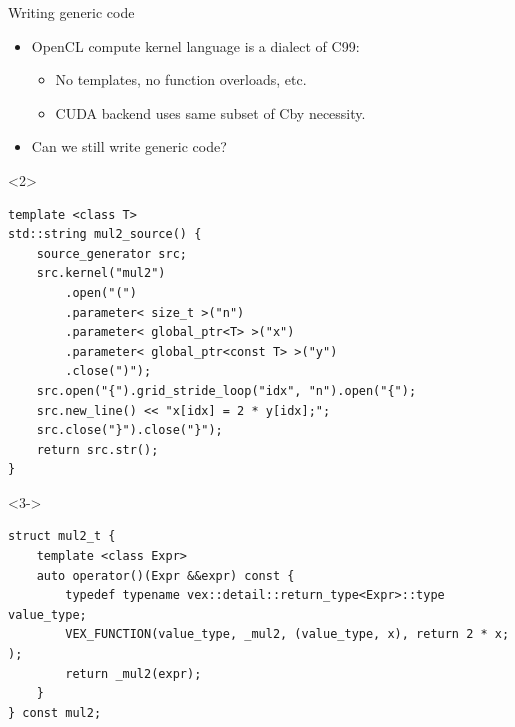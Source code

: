 \documentclass[@BEAMER_OPTIONS@]{beamer}
\newcommand{\CXX}{{\rm C}\plusplus}
\newcommand{\CC}{{\rm C99}\xspace}
\begin{document}
\begin{frame}[fragile]{Writing generic code}
    \begin{itemize}
        \item OpenCL compute kernel language is a dialect of \CC:
            \begin{itemize}
                \item No templates, no function overloads, etc.
                \item CUDA backend uses same subset of \CXX by necessity.
            \end{itemize}
        \item Can we still write generic code?
    \end{itemize}
    \vspace{-1\baselineskip}
    \begin{overlayarea}{\textwidth}{0.8\textheight}
        \begin{onlyenv}<2>
            \begin{exampleblock}{}
                \begin{lstlisting}
template <class T>
std::string mul2_source() {
    source_generator src;
    src.kernel("mul2")
        .open("(")
        .parameter< size_t >("n")
        .parameter< global_ptr<T> >("x")
        .parameter< global_ptr<const T> >("y")
        .close(")");
    src.open("{").grid_stride_loop("idx", "n").open("{");
    src.new_line() << "x[idx] = 2 * y[idx];";
    src.close("}").close("}");
    return src.str();
}
                \end{lstlisting}
            \end{exampleblock}
        \end{onlyenv}
        \begin{onlyenv}<3->
            \begin{exampleblock}{}
                \begin{lstlisting}
struct mul2_t {
    template <class Expr>
    auto operator()(Expr &&expr) const {
        typedef typename vex::detail::return_type<Expr>::type value_type;
        VEX_FUNCTION(value_type, _mul2, (value_type, x), return 2 * x; );
        return _mul2(expr);
    }
} const mul2;
                \end{lstlisting}
            \end{exampleblock}
            \begin{exampleblock}{}
                \begin{lstlisting}[numbers=none]

\end{lstlisting}
\end{exampleblock}
\end{onlyenv}
\end{overlayarea}
\end{frame}
\end{document}

